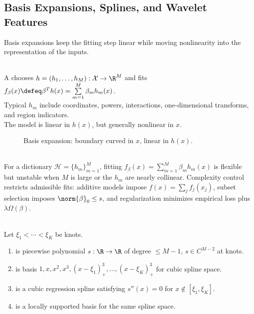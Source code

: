 \subsection{Basis Expansions, Splines, and Wavelet Features}

Basis expansions keep the fitting step linear while moving nonlinearity into the representation of the inputs.

\begin{definition} \label{def:sl-linear-basis-expansion} \\
A  chooses $h=(h_1,\ldots,h_M):\mathcal{X}\to\R^M$ and fits $f_\beta(x)\defeq\beta^Th(x)=\sum\limits_{m=1}^M\beta_mh_m(x)$.\\
Typical $h_m$ include coordinates, powers, interactions, one-dimensional transforms, and region indicators.\\
The model is linear in $h(x)$, but generally nonlinear in $x$.
\end{definition}

\begin{figure}[ht]
\centering

\caption{Basis expansion: boundary curved in $x$, linear in $h(x)$.}
\label{fig:sl-basis-expansion-curved-boundary}
\end{figure}

\begin{remark} \label{rem:sl-basis-dictionary-complexity} \\
For a dictionary $\mathcal{H}=\{h_m\}_{m=1}^M$, fitting $f_\beta(x)=\sum\limits_{m=1}^M\beta_mh_m(x)$ is flexible but unstable when $M$ is large or the $h_m$ are nearly collinear. Complexity control restricts admissible fits: additive models impose $f(x)=\sum_j f_j(x_j)$, subset selection imposes $\norm{\beta}_0\le s$, and regularization minimizes empirical loss plus $\lambda\Omega(\beta)$.
\end{remark}

\begin{definition} \label{def:sl-regression-splines} \\
Let $\xi_1<\cdots<\xi_K$ be knots.
\begin{enumerate}[label=(\roman*)]
\setlength{\itemsep}{0pt}
\item {} is piecewise polynomial $s:\R\to\R$ of degree $\le M-1$, $s\in C^{M-2}$ at knots.
\item {} is basis $1,x,x^2,x^3,(x-\xi_1)_+^3,\ldots,(x-\xi_K)_+^3$ for cubic spline space.
\item {} is a cubic regression spline satisfying $s''(x)=0$ for $x\notin[\xi_1,\xi_K]$.
\item {} is a locally supported basis for the same spline space.
\end{enumerate}
\end{definition}

